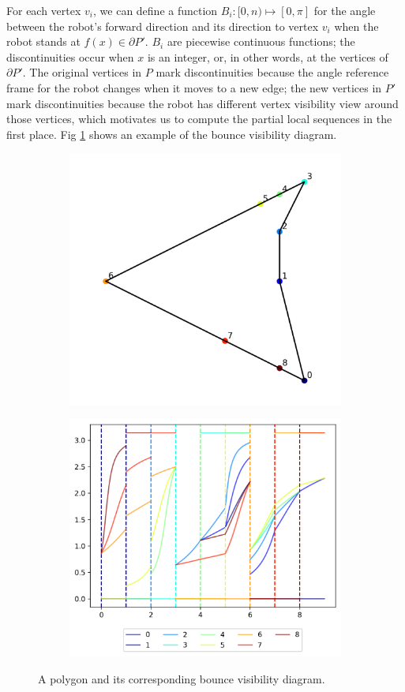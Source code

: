 \documentclass[]{styles/svproc}  %
\begin{document}
For each vertex $v_i$, we can define a function $B_i: [0, n) \mapsto [0, \pi]$
for the angle between the robot's forward direction and its direction to vertex
$v_i$ when the robot stands at $f(x)\in \partial P'$. $B_i$ are piecewise
continuous functions; the discontinuities occur when $x$ is an integer, or, in
other words, at the vertices of $\partial P'$. The original vertices in $P$ mark
discontinuities because the angle reference frame for the robot changes when it
moves to a new edge; the new vertices in $P'$ mark discontinuities because the
robot has different vertex visibility view around those vertices, which
motivates us to compute the partial local sequences in the first place.
Fig \ref{fig:bvd} shows an example of the bounce visibility diagram.

\begin{figure}

\centering
\begin{subfigure}{0.25\textwidth}
\centering
\includegraphics[width=0.7\linewidth]{figures/color_pent.png}
\end{subfigure}%
\begin{subfigure}{0.25\textwidth}
\centering
\includegraphics[width=0.8\linewidth]{figures/bvd.png}
\end{subfigure}
\caption{A polygon and its corresponding bounce visibility diagram.}
\label{fig:bvd}
\end{figure}
\end{document}
